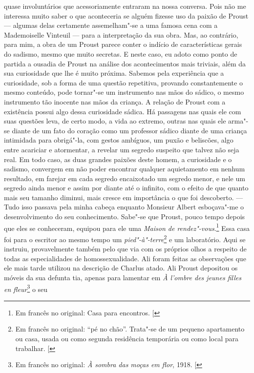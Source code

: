 quase involuntários que acessoriamente entraram na nossa conversa. Pois
não me interessa muito saber o que aconteceria se alguém fizesse uso da
paixão de Proust --- algumas delas certamente assemelham"-se a uma famosa
cena com a Mademoiselle Vinteuil --- para a interpretação da sua obra.
Mas, ao contrário, para mim, a obra de um Proust parece conter o indício
de características gerais do sadismo, mesmo que muito secretas. E neste
caso, eu adoto como ponto de partida a ousadia de Proust na análise dos
acontecimentos mais triviais, além da sua curiosidade que lhe é muito
próxima. Sabemos pela experiência que a curiosidade, sob a forma de uma
questão repetitiva, provando constantemente o mesmo conteúdo, pode
tornar"-se um instrumento nas mãos do sádico, o mesmo instrumento tão
inocente nas mãos da criança. A relação de Proust com a existência
possui algo dessa curiosidade sádica. Há passagens nas quais ele com
suas questões leva, de certo modo, a vida ao extremo, outras nas quais
ele arma"-se diante de um fato do coração como um professor sádico diante
de uma criança intimidada para obrigá"-la, com gestos ambíguos, um puxão
e beliscões, algo entre acariciar e atormentar, a revelar um segredo
suspeito que talvez não seja real. Em todo caso, as duas grandes paixões
deste homem, a curiosidade e o sadismo, convergem em não poder encontrar
qualquer aquietamento em nenhum resultado, em farejar em cada segredo
encaixotado um segredo menor, e nele um segredo ainda menor e assim por
diante até o infinito, com o efeito de que quanto mais seu tamanho
diminui, mais cresce em importância o que foi descoberto. --- Tudo isso
passava pela minha cabeça enquanto Monsieur Albert esboçava"-me o
desenvolvimento do seu conhecimento. Sabe"-se que Proust, pouco tempo
depois que eles se conheceram, equipou para ele uma \emph{Maison de
rendez"-vous}.\footnote{Em francês no original:  Casa para encontros. {[}\versal{N.~T.}{]}} Essa casa foi para o escritor ao mesmo tempo um
\emph{pied"-à"-terre}\footnote{Em francês no original: ``pé no chão''. Trata"-se de um pequeno apartamento ou casa, usada ou como segunda residência temporária ou como local para trabalhar. {[}\versal{N.~T.}{]}} e um laboratório. Aqui se instruiu,
provavelmente também pelo que via com os próprios olhos a respeito de
todas as especialidades de homossexualidade. Ali foram feitas as
observações que ele mais tarde utilizou na descrição de Charlus
atado. Ali Proust depositou os móveis da sua defunta tia, apenas
para lamentar em \emph{À l'ombre des jeunes filles en fleur}\footnote{Em francês no original: \emph{À sombra das moças em flor}, 1918. {[}\versal{N.~T.}{]}} o seu

